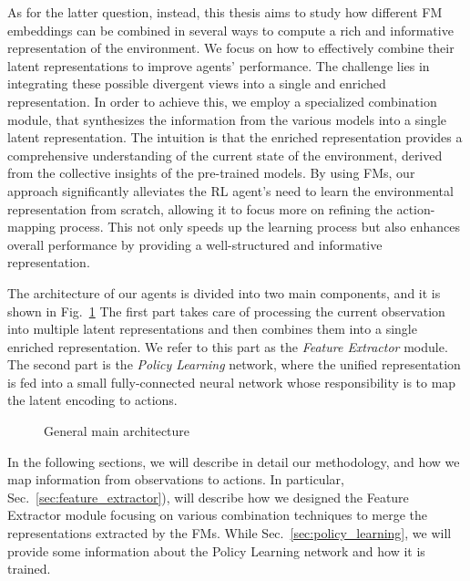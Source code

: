 As for the latter question, instead, this thesis aims to study how different FM embeddings can be combined in several ways to compute a rich and informative representation of the environment.
We focus on how to effectively combine their latent representations to improve agents' performance.
The challenge lies in integrating these possible divergent views into a single and enriched representation.
In order to achieve this, we employ a specialized combination module, that synthesizes the information from the various models into a single latent representation.
The intuition is that the enriched representation provides a comprehensive understanding of the current state of the environment, derived from the collective insights of the pre-trained models.
By using FMs, our approach significantly alleviates the RL agent's need to learn the environmental representation from scratch, allowing it to focus more on refining the action-mapping process.
This not only speeds up the learning process but also enhances overall performance by providing a well-structured and informative representation.

The architecture of our agents is divided into two main components, and it is shown in Fig.~\ref{fig:main}
The first part takes care of processing the current observation into multiple latent representations and then combines them into a single enriched representation.
We refer to this part as the \textit{Feature Extractor} module.
The second part is the \textit{Policy Learning} network, where the unified representation is fed into a small fully-connected neural network whose responsibility is to map the latent encoding to actions.


\begin{figure}[ht]
    \begin{center}
        \fbox{\rule[-.5cm]{0cm}{4cm} \rule[-.5cm]{4cm}{0cm}}
    \end{center}
    \caption{General main architecture}
    \label{fig:main}
\end{figure}


In the following sections, we will describe in detail our methodology, and how we map information from observations to actions.
In particular, Sec.~\ref{sec:feature_extractor}), will describe how we designed the Feature Extractor module focusing on various combination techniques to merge the representations extracted by the FMs.
While Sec.~\ref{sec:policy_learning}, we will provide some information about the Policy Learning network and how it is trained.




